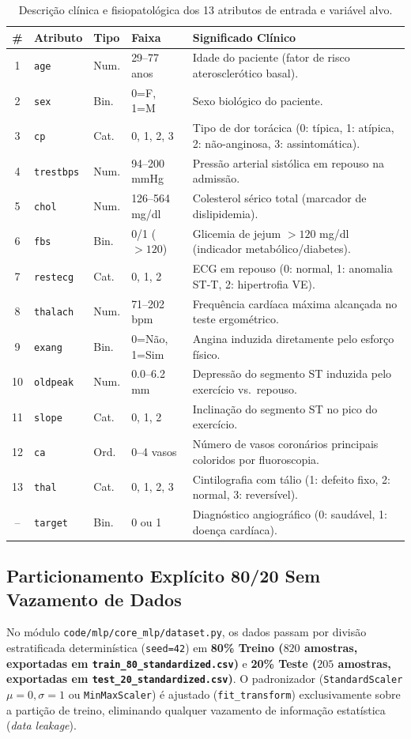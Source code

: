 \begin{table}[H]
\centering
\caption{Descrição clínica e fisiopatológica dos 13 atributos de entrada e variável alvo.}
\label{tab:atributos}
\footnotesize
\begin{tabular}{clllp{7.4cm}}
\toprule
\textbf{\#} & \textbf{Atributo} & \textbf{Tipo} & \textbf{Faixa} & \textbf{Significado Clínico} \\
\midrule
1 & \texttt{age} & Num. & 29--77 anos & Idade do paciente (fator de risco aterosclerótico basal). \\
2 & \texttt{sex} & Bin. & 0=F, 1=M & Sexo biológico do paciente. \\
3 & \texttt{cp} & Cat. & 0, 1, 2, 3 & Tipo de dor torácica (0: típica, 1: atípica, 2: não-anginosa, 3: assintomática). \\
4 & \texttt{trestbps} & Num. & 94--200 mmHg & Pressão arterial sistólica em repouso na admissão. \\
5 & \texttt{chol} & Num. & 126--564 mg/dl & Colesterol sérico total (marcador de dislipidemia). \\
6 & \texttt{fbs} & Bin. & 0/1 ($>120$) & Glicemia de jejum $> 120$ mg/dl (indicador metabólico/diabetes). \\
7 & \texttt{restecg} & Cat. & 0, 1, 2 & ECG em repouso (0: normal, 1: anomalia ST-T, 2: hipertrofia VE). \\
8 & \texttt{thalach} & Num. & 71--202 bpm & Frequência cardíaca máxima alcançada no teste ergométrico. \\
9 & \texttt{exang} & Bin. & 0=Não, 1=Sim & Angina induzida diretamente pelo esforço físico. \\
10 & \texttt{oldpeak} & Num. & 0.0--6.2 mm & Depressão do segmento ST induzida pelo exercício vs.\ repouso. \\
11 & \texttt{slope} & Cat. & 0, 1, 2 & Inclinação do segmento ST no pico do exercício. \\
12 & \texttt{ca} & Ord. & 0--4 vasos & Número de vasos coronários principais coloridos por fluoroscopia. \\
13 & \texttt{thal} & Cat. & 0, 1, 2, 3 & Cintilografia com tálio (1: defeito fixo, 2: normal, 3: reversível). \\
\midrule
-- & \texttt{target} & Bin. & 0 ou 1 & Diagnóstico angiográfico (0: saudável, 1: doença cardíaca). \\
\bottomrule
\end{tabular}
\end{table}

\subsection{Particionamento Explícito 80/20 Sem Vazamento de Dados}
No módulo \texttt{code/mlp/core\_mlp/dataset.py}, os dados passam por divisão estratificada determinística (\texttt{seed=42}) em \textbf{80\% Treino ($820$ amostras, exportadas em \texttt{train\_80\_standardized.csv})} e \textbf{20\% Teste ($205$ amostras, exportadas em \texttt{test\_20\_standardized.csv})}. O padronizador (\texttt{StandardScaler} $\mu=0, \sigma=1$ ou \texttt{MinMaxScaler}) é ajustado (\texttt{fit\_transform}) exclusivamente sobre a partição de treino, eliminando qualquer vazamento de informação estatística (\textit{data leakage}).
